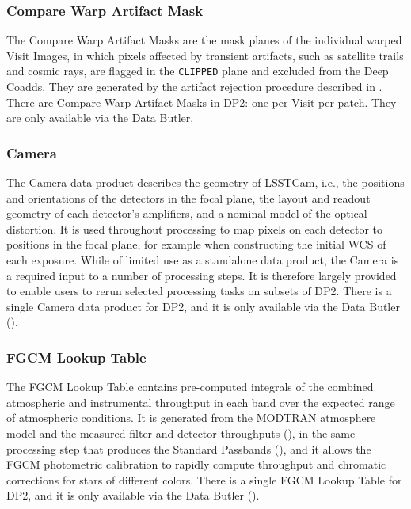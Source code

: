 \subsubsection{Compare Warp Artifact Mask}
The Compare Warp Artifact Masks are the mask planes of the individual warped \glspl{Visit Image}, in which pixels affected by transient artifacts, such as satellite trails and cosmic rays, are flagged in the \texttt{CLIPPED} plane and excluded from the Deep Coadds.
They are generated by the artifact rejection procedure described in .
There are \ncomparewarpartifactmasks Compare Warp Artifact Masks in \gls{DP2}: one per \gls{Visit} per \gls{patch}.
They are only available via the Data Butler.

\subsubsection{Camera}
The Camera data product describes the geometry of \gls{LSSTCam}, i.e., the positions and orientations of the detectors in the focal plane, the layout and readout geometry of each detector's amplifiers, and a nominal model of the optical distortion.
It is used throughout processing to map pixels on each detector to positions in the focal plane, for example when constructing the initial \gls{WCS} of each exposure.
While of limited use as a standalone data product, the Camera is a required input to a number of processing steps.
It is therefore largely provided to enable users to rerun selected processing tasks on subsets of DP2.
There is a single Camera data product for \gls{DP2}, and it is only available via the Data \gls{Butler} ().

\subsubsection{FGCM Lookup Table}
The FGCM Lookup Table contains pre-computed integrals of the combined atmospheric and instrumental throughput in each band over the expected range of atmospheric conditions.
It is generated from the MODTRAN atmosphere model and the measured filter and detector throughputs (), in the same processing step that produces the Standard Passbands (), and it allows the \gls{FGCM} photometric calibration to rapidly compute throughput and chromatic corrections for stars of different colors.
There is a single FGCM Lookup Table for \gls{DP2}, and it is only available via the Data \gls{Butler} ().

